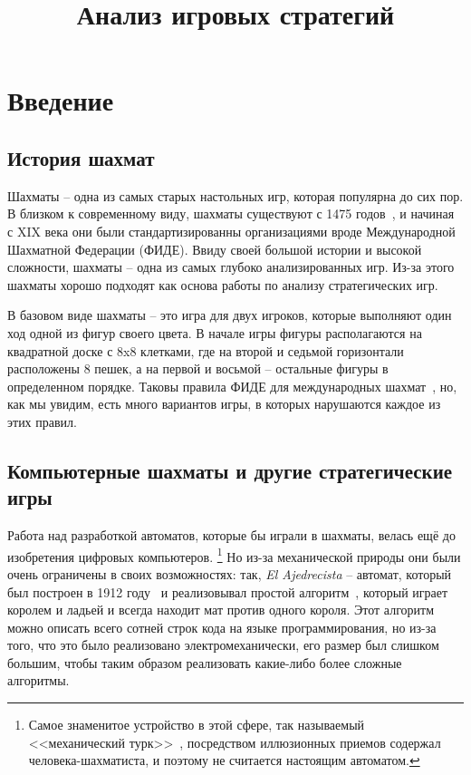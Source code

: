\documentclass{article}
\title{Анализ игровых стратегий}
\begin{document}
\maketitle

\section{Введение}

\subsection{История шахмат}

Шахматы -- одна из самых старых настольных игр, которая популярна до сих пор.
В близком к современному виду, шахматы существуют с 1475 годов~\cite{world_of_chess},
и начиная с XIX века они были стандартизированны организациями вроде Международной
Шахматной Федерации (ФИДЕ). Ввиду своей большой истории и высокой сложности, шахматы -- 
одна из самых глубоко анализированных игр. Из-за этого шахматы хорошо подходят 
как основа работы по анализу стратегических игр.

В базовом виде шахматы -- это игра для двух игроков,
которые выполняют один ход одной из фигур своего цвета. 
В начале игры фигуры располагаются на квадратной доске с 8x8 клетками,
где на второй и седьмой горизонтали расположены 8 пешек,
а на первой и восьмой -- остальные фигуры в определенном порядке.
Таковы правила ФИДЕ для международных шахмат~\cite{fide-laws},
но, как мы увидим, есть много вариантов игры,
в которых нарушаются каждое из этих правил.

\subsection{Компьютерные шахматы и другие стратегические игры}

Работа над разработкой автоматов, которые бы играли в шахматы,
велась ещё до изобретения цифровых компьютеров.
\footnote{Самое знаменитое устройство в этой сфере, так называемый <<механический турк>>~\cite{mechturk},
посредством иллюзионных приемов содержал человека-шахматиста,
и поэтому не считается настоящим автоматом.}
Но из-за механической природы они были очень ограничены в своих возможностях:
так, \emph{El Ajedrecista} -- автомат, который был построен в 1912 году~\cite{ajedrecista-article}
и реализовывал простой алгоритм~\cite{ajedrecista-algo}, который играет королем и ладьей
и всегда находит мат против одного короля.
Этот алгоритм можно описать всего сотней строк кода на языке программирования,
но из-за того, что это было реализовано электромеханически,
его размер был слишком большим,
чтобы таким образом реализовать какие-либо более сложные алгоритмы.
\end{document}
